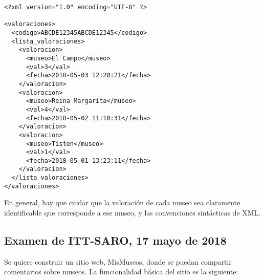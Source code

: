 \begin{verbatim}
<?xml version="1.0" encoding="UTF-8" ?>

<valoraciones>
  <codigo>ABCDE12345ABCDE12345</codigo>
  <lista_valoraciones>
    <valoracion>
      <museo>El Campo</museo>
      <val>3</val>
      <fecha>2018-05-03 12:20:21</fecha>
    </valoracion>
    <valoracion>
      <museo>Reina Margarita</museo>
      <val>4</val>
      <fecha>2018-05-02 11:10:31</fecha>
    </valoracion>
    <valoracion>
      <museo>Tisten</museo>
      <val>1</val>
      <fecha>2018-05-01 13:23:11</fecha>
    </valoracion>
  </lista_valoraciones>
</valoraciones>
\end{verbatim}

En general, hay que cuidar que la valoración de cada museo sea claramente identificable que corresponde a ese museo, y las convenciones sintácticas de XML.


\subsection{Examen de ITT-SARO, 17 mayo de 2018}


Se quiere construir un sitio web, MisMuseos, donde se puedan compartir comentarios sobre museos. La funcionalidad básica del sitio es la siguiente:

